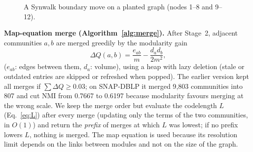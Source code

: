 \documentclass[conference]{IEEEtran}
\begin{document}
\begin{figure}[t]
\caption{A Synwalk boundary move on a planted graph (nodes 1--8 and 9--12).}
\label{fig:m6}
\end{figure}


\textbf{Map-equation merge (Algorithm~\ref{alg:merge}).} After Stage~2, adjacent communities $a,b$ are merged greedily by the modularity gain
\begin{equation}
\Delta Q(a,b)=\frac{e_{ab}}{m}-\frac{d_ad_b}{2m^2},\label{eq:dq}
\end{equation}
($e_{ab}$: edges between them, $d_a$: volume), using a heap with lazy deletion (stale or outdated entries are skipped or refreshed when popped). The earlier version kept all merges if $\sum\Delta Q\ge0.03$; on SNAP-DBLP it merged 9{,}803 communities into 807 and cut NMI from 0.7667 to 0.6197 because modularity favours merging at the wrong scale. We keep the merge order but evaluate the codelength $L$ (Eq.~\eqref{eq:L}) after every merge (updating only the terms of the two communities, in $O(1)$) and return the \emph{prefix} of merges at which $L$ was lowest; if no prefix lowers $L$, nothing is merged. The map equation is used because its resolution limit depends on the links between modules and not on the size of the graph.
\end{document}
